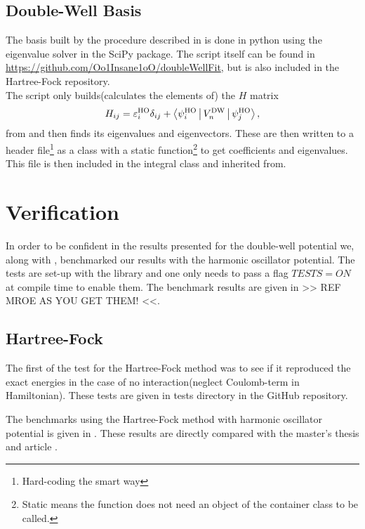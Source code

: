 \subsection{Double-Well Basis}
    The basis built by the procedure described in  is done in
    python using the eigenvalue solver in the SciPy package. The script itself
    can be found in \url{https://github.com/Oo1Insane1oO/doubleWellFit}, but is
    also included in the Hartree-Fock repository. \\
    The script only builds(calculates the elements of) the $H$ matrix 
        \begin{equation}
            H_{ij} = \varepsilon^{\text{HO}}_i\delta_{ij} +
            \Braket{\psi^{\text{HO}}_i|V^{\text{DW}}_n|\psi^{\text{HO}}_j},
        \end{equation}
    from  and then finds its eigenvalues and eigenvectors.
    These are then written to a \CC header file\footnote{Hard-coding the smart
    way} as a class with a static function\footnote{Static means the function
    does not need an object of the container class to be called.} to get
    coefficients and eigenvalues. This file is then included in the
     integral class and inherited from.

\section{Verification\label{sec:verification}}
    In order to be confident in the results presented for the double-well
    potential we, along with , benchmarked our results with
    the harmonic oscillator potential. The tests are set-up with the
    \cite{UnitTest++} library and one only needs to pass a flag
    $TESTS=ON$ at compile time to enable them. The benchmark results are given
    in  >> REF MROE AS YOU GET THEM! <<.

\subsection{Hartree-Fock}
    The first of the test for the Hartree-Fock method was to see if it
    reproduced the exact energies in the case of no interaction(neglect
    Coulomb-term in Hamiltonian). These tests are given in tests directory in
    the GitHub repository.
    
    The benchmarks using the Hartree-Fock method with harmonic oscillator
    potential is given in . These results are directly compared
    with the master's thesis \cite{lohnethesis} and article
    \cite{hfrefarticle}.
    
